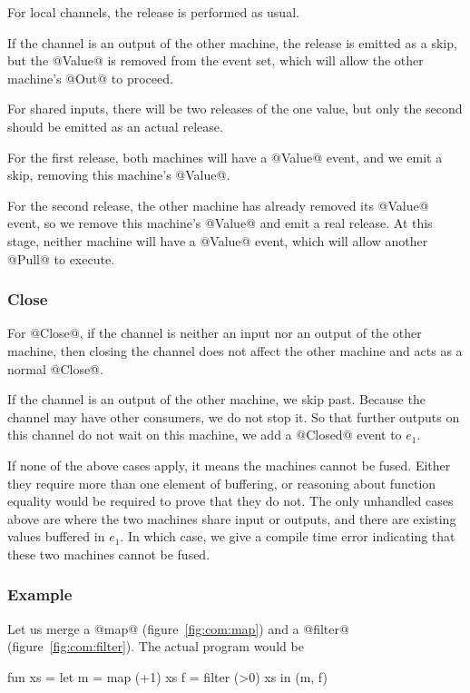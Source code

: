 For local channels, the release is performed as usual.

If the channel is an output of the other machine, the release is emitted as a skip, but the @Value@ is removed from the event set, which will allow the other machine's @Out@ to proceed.

For shared inputs, there will be two releases of the one value, but only the second should be emitted as an actual release.

For the first release, both machines will have a @Value@ event, and we emit a skip, removing this machine's @Value@.

For the second release, the other machine has already removed its @Value@ event, so we remove this machine's @Value@ and emit a real release.
At this stage, neither machine will have a @Value@ event, which will allow another @Pull@ to execute.

\subsubsection{Close}
For @Close@, if the channel is neither an input nor an output of the other machine, then closing the channel does not affect the other machine and acts as a normal @Close@.

If the channel is an output of the other machine, we skip past.
Because the channel may have other consumers, we do not stop it.
So that further outputs on this channel do not wait on this machine, we add a @Closed@ event to $e_1$.



If none of the above cases apply, it means the machines cannot be fused.
Either they require more than one element of buffering, or reasoning about function equality would be required to prove that they do not.
The only unhandled cases above are where the two machines share input or outputs, and there are existing values buffered in $e_1$.
In which case, we give a compile time error indicating that these two machines cannot be fused.

\subsubsection{Example}
Let us merge a @map@ (figure~\ref{fig:com:map}) and a @filter@ (figure~\ref{fig:com:filter}).
The actual program would be
\begin{code}
fun xs
 = let m  = map    (+1) xs
       f  = filter (>0) xs
   in (m, f)
\end{code}

